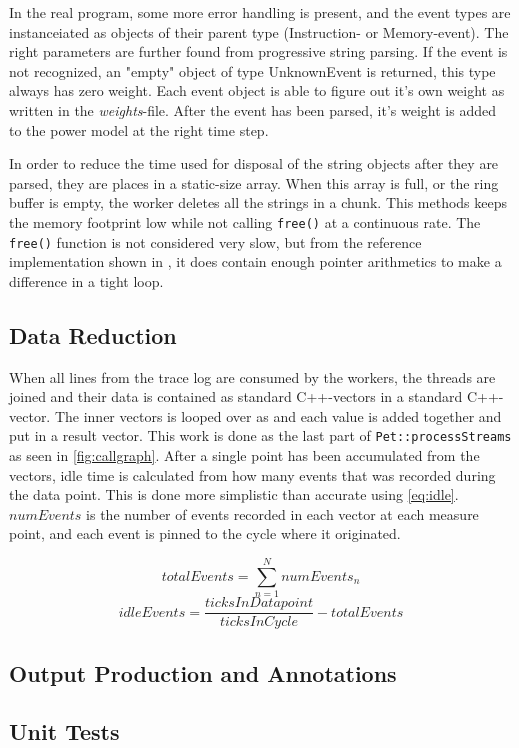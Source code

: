 In the real program, some more error handling is present, and the event types
are instanceiated as objects of their parent type (Instruction- or
Memory-event). The right parameters are further found from progressive string
parsing. If the event is not recognized, an "empty" object of type UnknownEvent
is returned, this type always has zero weight. Each event object is able to
figure out it's own weight as written in the \emph{weights}-file. After the
event has been parsed, it's weight is added to the power model at the right
time step.

In order to reduce the time used for disposal of the string objects
after they are parsed, they are places in a static-size array. When
this array is full, or the ring buffer is empty, the worker deletes
all the strings in a chunk. This methods keeps the memory footprint
low while not calling \texttt{free()} at a continuous rate. The \texttt{free()}
function is not considered very slow, but from the reference implementation
shown in \cite{kernighan1988c}, it does contain enough pointer
arithmetics to make a difference in a tight loop.

\subsection{Data Reduction}

When all lines from the trace log are consumed by the workers, the threads are
joined and their data is contained as standard C++-vectors in a standard C++-vector.
The inner vectors is looped over as and each value is added together and put in a
result vector. This work is done as the last part of \texttt{Pet::processStreams} as seen in
\autoref{fig:callgraph}. After a single point has been accumulated from the vectors, idle time
is calculated from how many events that was recorded during the data point. This is
done more simplistic than accurate using \autoref{eq:idle}. $numEvents$ is the number
of events recorded in each vector at each measure point, and each event is pinned to
the cycle where it originated.

\begin{equation}
    totalEvents = \sum_{n=1}^{N} numEvents_n
\end{equation}
\begin{equation}
    idleEvents = \frac{ticksInDatapoint}{ticksInCycle}- totalEvents
\label{eq:idle}
\end{equation}


\subsection{Output Production and Annotations}

\subsection{Unit Tests}


